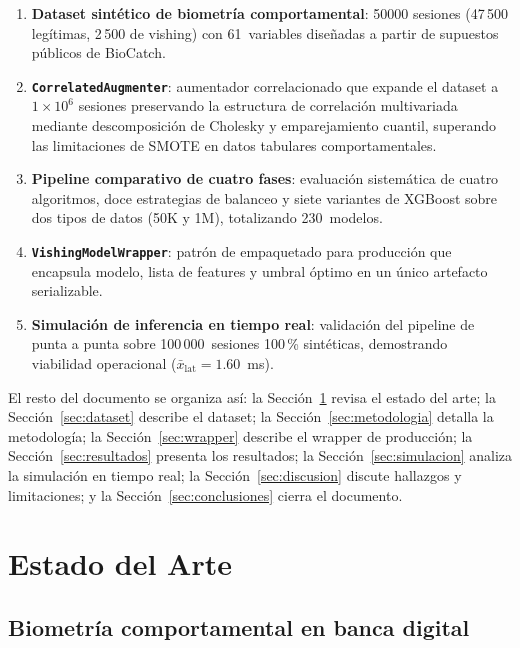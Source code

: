 \documentclass[journal]{IEEEtran}
\newcommand{\wrapcls}{\texttt{VishingModelWrapper}}
\newcommand{\augcls}{\texttt{CorrelatedAugmenter}}
\begin{document}
\begin{enumerate}
    \item \textbf{Dataset sintético de biometría comportamental}: \num{50000}
    sesiones (47\,500 legítimas, 2\,500 de vishing) con 61~variables
    diseñadas a partir de supuestos públicos de BioCatch.

    \item \textbf{\augcls{}}: aumentador correlacionado que expande el
    dataset a $1\times10^6$ sesiones preservando la estructura de correlación
    multivariada mediante descomposición de Cholesky y emparejamiento
    cuantil, superando las limitaciones de SMOTE en datos tabulares
    comportamentales.

    \item \textbf{Pipeline comparativo de cuatro fases}: evaluación sistemática
    de cuatro algoritmos, doce estrategias de balanceo y siete variantes de
    XGBoost sobre dos tipos de datos (50K y 1M), totalizando 230~modelos.

    \item \textbf{\wrapcls{}}: patrón de empaquetado para producción que
    encapsula modelo, lista de features y umbral óptimo en un único artefacto
    serializable.

    \item \textbf{Simulación de inferencia en tiempo real}: validación del
    pipeline de punta a punta sobre 100\,000~sesiones 100\,\% sintéticas,
    demostrando viabilidad operacional ($\bar{x}_{\text{lat}}=1.60$~ms).
\end{enumerate}

El resto del documento se organiza así: la Sección~\ref{sec:arte} revisa el
estado del arte; la Sección~\ref{sec:dataset} describe el dataset; la
Sección~\ref{sec:metodologia} detalla la metodología; la
Sección~\ref{sec:wrapper} describe el wrapper de producción; la
Sección~\ref{sec:resultados} presenta los resultados; la
Sección~\ref{sec:simulacion} analiza la simulación en tiempo real; la
Sección~\ref{sec:discusion} discute hallazgos y limitaciones; y la
Sección~\ref{sec:conclusiones} cierra el documento.

\section{Estado del Arte}
\label{sec:arte}

\subsection{Biometría comportamental en banca digital}
\end{document}
